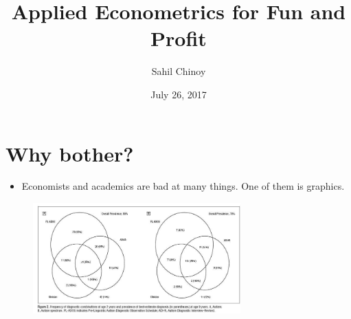\documentclass{beamer}
\title[]{Applied Econometrics for Fun and Profit} %
\author{Sahil Chinoy} %
\institute %
{
 \\ %
}
\date{July 26, 2017} %
\begin{document}
\begin{frame}
\titlepage %
\end{frame}

\begin{frame}
\tableofcontents %
\end{frame}


\section{Why bother?}

\begin{frame}
	\begin{itemize}
		\item Economists and academics are bad at many things. One of them is graphics.
	\end{itemize}
	\begin{figure}
		\includegraphics[width=8cm]{autism-test-figure-21.jpg}
		\centering
	\end{figure}
\end{frame}
\end{document}

